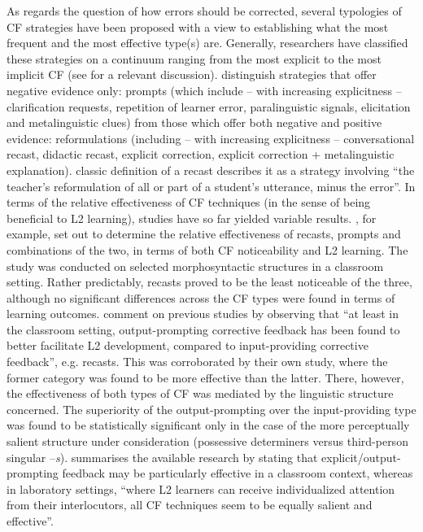 \documentclass[output=paper,colorlinks,citecolor=brown,modfonts,nonflat]{../langscibook}
\begin{document}
As regards the question of how errors should be corrected, several typologies of CF strategies have been proposed with a view to establishing what the most frequent and the most effective type(s) are. Generally, researchers have classified these strategies on a continuum ranging from the most explicit to the most implicit CF (see \citet{Sheen2006} for a relevant discussion). \citet{LysterEtAl2013} distinguish strategies that offer negative evidence only: prompts (which include – with increasing explicitness – clarification requests, repetition of learner error, paralinguistic signals, elicitation and metalinguistic clues) from those which offer both negative and positive evidence: reformulations (including – with increasing explicitness – conversational recast, didactic recast, explicit correction, explicit correction + metalinguistic explanation). \citet[46]{LysterRanta1997} classic definition of a recast describes it as a strategy involving “the teacher’s reformulation of all or part of a student’s utterance, minus the error”. In terms of the relative effectiveness of CF techniques (in the sense of being beneficial to L2 learning), studies have so far yielded variable results. \citet{KartchavaAmmar2014}, for example, set out to determine the relative effectiveness of recasts, prompts and combinations of the two, in terms of both CF noticeability and L2 learning. The study was conducted on selected morphosyntactic structures in a classroom setting. Rather predictably, recasts proved to be the least noticeable of the three, although no significant differences across the CF types were found in terms of learning outcomes. \citet[514]{SatoLoewen2018} comment on previous studies by observing that “at least in the classroom setting, output-prompting corrective feedback has been found to better facilitate L2 development, compared to input-providing corrective feedback”, e.g. recasts. This was corroborated by their own study, where the former category was found to be more effective than the latter. There, however, the effectiveness of both types of CF was mediated by the linguistic structure concerned. The superiority of the output-prompting over the input-providing type was found to be statistically significant only in the case of the more perceptually salient structure under consideration (possessive determiners versus third-person singular –\textit{s}). \citet{SaitoInPress} summarises the available research by stating that explicit/output-prompting feedback may be particularly effective in a classroom context, whereas in laboratory settings, “where L2 learners can receive individualized attention from their interlocutors, all CF techniques seem to be equally salient and effective”.
\end{document}
